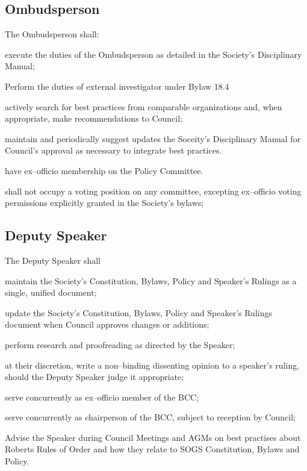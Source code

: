 \subsection{Ombudsperson}
The Ombudsperson shall:
\begin{longenum}[ label*=\thesubsection.\arabic*., align=left]


\item execute the duties of the Ombudsperson as detailed in the Society's Disciplinary Manual; 
\item Perform the duties of external investigator under Bylaw 18.4
\item actively search for best practices from comparable organizations and, when appropriate, make recommendations to Council;
\item maintain and periodically suggest updates the Soceity's Disciplinary Manual for Council's approval
as necessary to integrate best practices.
\item have ex--officio membership on the Policy Committee.
\item shall not occupy a voting position on any committee, excepting ex--officio voting permissions explicitly granted in the Society's bylaws;
\end{longenum}
\subsection{Deputy Speaker}
The Deputy Speaker shall
\begin{longenum}[ label*=\thesubsection.\arabic*., align=left]
\item maintain the Society's Constitution, Bylaws, Policy and Speaker's Rulings as a single, unified document;
\item update the Society's Constitution, Bylaws, Policy and Speaker's Rulings document when Council approves changes or additions;
\item perform research and proofreading as directed by the Speaker;
\item at their discretion, write a non--binding dissenting opinion to a speaker's ruling, should the Deputy Speaker judge it appropriate;
\item serve concurrently as ex--officio member of the BCC;
\item serve concurrently as chairperson of the BCC, subject to reception by Council;
\item Advise the Speaker during Council Meetings and AGMs on best practises about Roberts Rules of Order and how they relate to SOGS Constitution, Bylaws and Policy.

\end{longenum}

